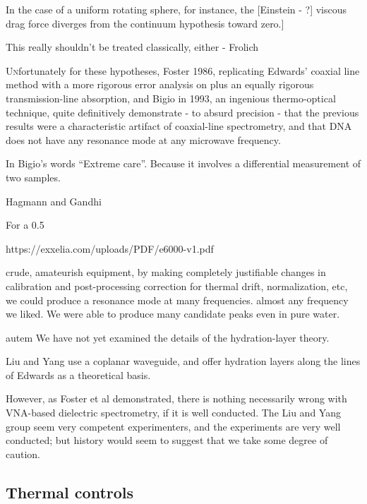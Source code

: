 \documentclass[paper.tex]{subfiles}
\begin{document}
In the case of a uniform rotating sphere, for instance, the [Einstein - ?] viscous drag force diverges from the continuum hypothesis toward zero.]

This really shouldn’t be treated classically, either - Frolich 

\lettrine{U}nfortunately for these hypotheses, Foster 1986, replicating Edwards’ coaxial line method with a more rigorous error analysis on plus an equally rigorous transmission-line absorption, and Bigio in 1993, an ingenious thermo-optical technique, quite definitively demonstrate - to absurd precision -  that the previous results were a characteristic artifact of coaxial-line spectrometry, and that DNA does not have any resonance mode at any microwave frequency.

In Bigio’s words “Extreme care”. Because it involves a differential measurement of two samples.

Hagmann and Gandhi \cite{Substitution1982}



For a 0.5%

https://exxelia.com/uploads/PDF/e6000-v1.pdf


crude, amateurish equipment, by making completely justifiable changes in calibration and post-processing correction for thermal drift, normalization, etc, we could produce a resonance mode at many frequencies. almost any frequency we liked. We were able to produce many candidate peaks even in pure water.


autem We have not yet examined the details of the hydration-layer theory.


Liu and Yang use a coplanar waveguide, and offer hydration layers along the lines of Edwards as a theoretical basis.




However, as Foster et al demonstrated, there is nothing necessarily wrong with VNA-based dielectric spectrometry, if it is well conducted. The Liu and Yang group seem very competent experimenters, and the experiments are very well conducted; but history would seem to suggest that we take some degree of caution.




\subsection{Thermal controls}
\end{document}
